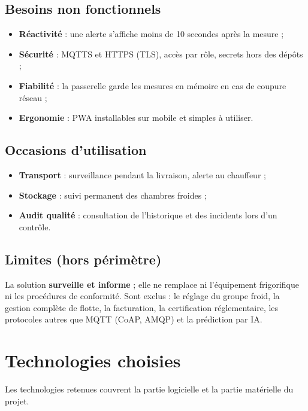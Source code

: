 \documentclass[11pt,a4paper]{article}
\let\oldsection\section
\renewcommand{\section}{\Needspace{10\baselineskip}\oldsection}
\begin{document}
\subsection{Besoins non fonctionnels}
\begin{itemize}
  \item \textbf{Réactivité} : une alerte s'affiche moins de 10 secondes après la mesure ;
  \item \textbf{Sécurité} : MQTTS et HTTPS (TLS), accès par rôle, secrets hors des dépôts ;
  \item \textbf{Fiabilité} : la passerelle garde les mesures en mémoire en cas de coupure réseau ;
  \item \textbf{Ergonomie} : PWA installables sur mobile et simples à utiliser.
\end{itemize}

\subsection{Occasions d'utilisation}
\begin{itemize}
  \item \textbf{Transport} : surveillance pendant la livraison, alerte au chauffeur ;
  \item \textbf{Stockage} : suivi permanent des chambres froides ;
  \item \textbf{Audit qualité} : consultation de l'historique et des incidents lors d'un contrôle.
\end{itemize}

\subsection{Limites (hors périmètre)}
La solution \textbf{surveille et informe} ; elle ne remplace ni l'équipement frigorifique
ni les procédures de conformité. Sont exclus : le réglage du groupe froid, la gestion
complète de flotte, la facturation, la certification réglementaire, les protocoles autres
que MQTT (CoAP, AMQP) et la prédiction par IA.

\section{Technologies choisies}\label{sec:techno}
Les technologies retenues couvrent la partie logicielle et la partie matérielle du projet.
\end{document}
